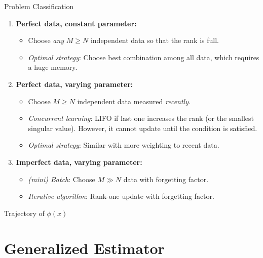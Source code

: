 \documentclass[]{beamer}
\theoremstyle{plain}
\theoremstyle{definition}
\theoremstyle{remark}
\begin{document}
\begin{frame}{Problem Classification}
	\begin{enumerate}
		\item<+-> \textbf{Perfect data, constant parameter:}
			\begin{itemize} 
				\item Choose \textit{any} $M \ge N$ independent data so that the rank
					is full.
				\item \textit{Optimal strategy}: Choose \alert{best combination} among
					all data, which requires a huge memory.
			\end{itemize}
		\item<+-> \textbf{Perfect data, varying parameter:}
			\begin{itemize}
				\item Choose $M \ge N$ independent data measured \textit{recently}.
				\item \textit{Concurrent learning}: \alert{LIFO} if last one increases
					the rank (or the smallest singular value). \alert{However}, it cannot
					update until the condition is satisfied.
				\item \textit{Optimal strategy}: Similar with more weighting to recent
					data.
			\end{itemize}
		\item<+-> \textbf{Imperfect data, varying parameter:}
			\begin{itemize}
				\item \textit{(mini) Batch}: Choose \alert{$M \gg N$} data with
					forgetting factor.
				\item \textit{Iterative algorithm}: Rank-one update with
					forgetting factor. 
		\end{itemize}
	\end{enumerate}
\end{frame}

\begin{frame}{Trajectory of $\phi(x)$}
	\centering
\end{frame}


\section{Generalized Estimator}
\end{document}
